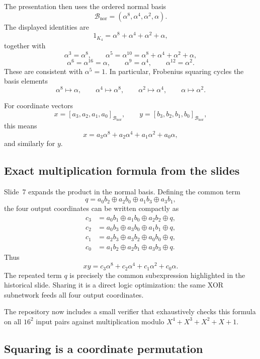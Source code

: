 \documentclass[11pt]{article}
\begin{document}
The presentation then uses the ordered normal basis
\[
  \mathcal B_{\mathrm{nor}}
  =
  (\alpha^8,\alpha^4,\alpha^2,\alpha).
\]
The displayed identities are
\[
  1_{K_4}=\alpha^8+\alpha^4+\alpha^2+\alpha,
\]
together with
\[
  \alpha^3=\alpha^8,\qquad
  \alpha^5=\alpha^{10}
    =\alpha^8+\alpha^4+\alpha^2+\alpha,
\]
\[
  \alpha^6=\alpha^{16}=\alpha,\qquad
  \alpha^9=\alpha^4,\qquad
  \alpha^{12}=\alpha^2.
\]
These are consistent with $\alpha^5=1$.  In particular, Frobenius squaring
cycles the basis elements
\[
  \alpha^8\mapsto\alpha,\qquad
  \alpha^4\mapsto\alpha^8,\qquad
  \alpha^2\mapsto\alpha^4,\qquad
  \alpha\mapsto\alpha^2.
\]

For coordinate vectors
\[
  x=[a_3,a_2,a_1,a_0]_{\mathcal B_{\mathrm{nor}}},
  \qquad
  y=[b_3,b_2,b_1,b_0]_{\mathcal B_{\mathrm{nor}}},
\]
this means
\[
  x=a_3\alpha^8+a_2\alpha^4+a_1\alpha^2+a_0\alpha,
\]
and similarly for $y$.

\subsection{Exact multiplication formula from the slides}

Slide~7 expands the product in the normal basis.  Defining the common term
\[
  q
  =
  a_0b_2\oplus a_2b_0\oplus a_1b_3\oplus a_3b_1,
\]
the four output coordinates can be written compactly as
\begin{align*}
  c_3 &=
  a_0b_1\oplus a_1b_0\oplus a_2b_2\oplus q,\\
  c_2 &=
  a_0b_3\oplus a_3b_0\oplus a_1b_1\oplus q,\\
  c_1 &=
  a_2b_3\oplus a_3b_2\oplus a_0b_0\oplus q,\\
  c_0 &=
  a_1b_2\oplus a_2b_1\oplus a_3b_3\oplus q.
\end{align*}
Thus
\[
  xy
  =
  c_3\alpha^8+c_2\alpha^4+c_1\alpha^2+c_0\alpha.
\]
The repeated term $q$ is precisely the common subexpression highlighted in the
historical slide.  Sharing it is a direct logic optimization: the same XOR
subnetwork feeds all four output coordinates.

The repository now includes a small verifier that exhaustively checks this
formula on all $16^2$ input pairs against multiplication modulo
$X^4+X^3+X^2+X+1$.

\subsection{Squaring is a coordinate permutation}
\end{document}
